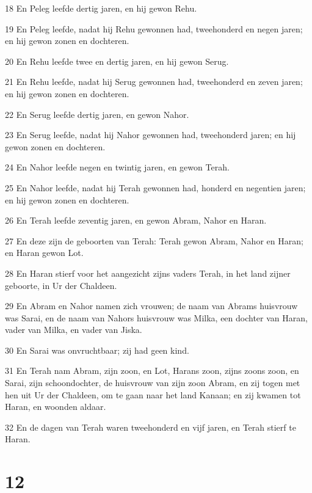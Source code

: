 \par 18 En Peleg leefde dertig jaren, en hij gewon Rehu.
\par 19 En Peleg leefde, nadat hij Rehu gewonnen had, tweehonderd en negen jaren; en hij gewon zonen en dochteren.
\par 20 En Rehu leefde twee en dertig jaren, en hij gewon Serug.
\par 21 En Rehu leefde, nadat hij Serug gewonnen had, tweehonderd en zeven jaren; en hij gewon zonen en dochteren.
\par 22 En Serug leefde dertig jaren, en gewon Nahor.
\par 23 En Serug leefde, nadat hij Nahor gewonnen had, tweehonderd jaren; en hij gewon zonen en dochteren.
\par 24 En Nahor leefde negen en twintig jaren, en gewon Terah.
\par 25 En Nahor leefde, nadat hij Terah gewonnen had, honderd en negentien jaren; en hij gewon zonen en dochteren.
\par 26 En Terah leefde zeventig jaren, en gewon Abram, Nahor en Haran.
\par 27 En deze zijn de geboorten van Terah: Terah gewon Abram, Nahor en Haran; en Haran gewon Lot.
\par 28 En Haran stierf voor het aangezicht zijns vaders Terah, in het land zijner geboorte, in Ur der Chaldeen.
\par 29 En Abram en Nahor namen zich vrouwen; de naam van Abrams huisvrouw was Sarai, en de naam van Nahors huisvrouw was Milka, een dochter van Haran, vader van Milka, en vader van Jiska.
\par 30 En Sarai was onvruchtbaar; zij had geen kind.
\par 31 En Terah nam Abram, zijn zoon, en Lot, Harans zoon, zijns zoons zoon, en Sarai, zijn schoondochter, de huisvrouw van zijn zoon Abram, en zij togen met hen uit Ur der Chaldeen, om te gaan naar het land Kanaan; en zij kwamen tot Haran, en woonden aldaar.
\par 32 En de dagen van Terah waren tweehonderd en vijf jaren, en Terah stierf te Haran.

\chapter{12}

